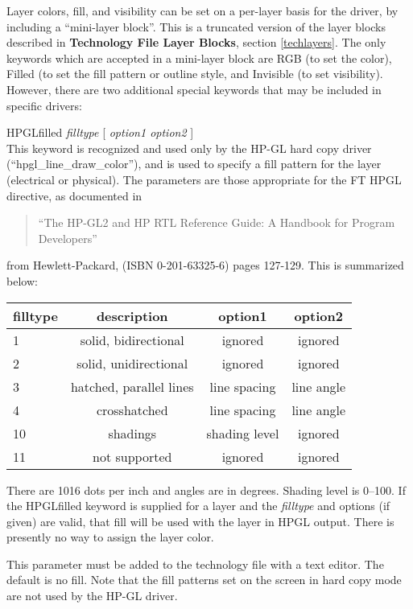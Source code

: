 Layer colors, fill, and visibility can be set on a per-layer basis for
the driver, by including a ``mini-layer block''.  This is a truncated
version of the layer blocks described in {\bf Technology File Layer
Blocks}, section \ref{techlayers}.  The only keywords which are
accepted in a mini-layer block are {\vt RGB} (to set the color), {\vt
Filled} (to set the fill pattern or outline style, and {\vt Invisible}
(to set visibility).  However, there are two additional special
keywords that may be included in specific drivers:

\begin{description}
\item{\vt HPGLfilled} {\it filltype} [ {\it option1 option2\/} ]\\
This keyword is recognized and used only by the HP-GL hard copy driver
(``hpgl\_line\_draw\_color''), and is used to specify a fill pattern
for the layer (electrical or physical).  The parameters are those
appropriate for the {\vt FT} HPGL directive, as documented in
\begin{quote}
 ``{\sc The HP-GL2 and HP RTL Reference Guide:  A
Handbook for Program Developers}''
\end{quote}
from Hewlett-Packard, (ISBN 0-201-63325-6) pages 127-129.  This is
summarized below:

\begin{tabular}{|l|c|c|c|}\hline
\bf filltype & \bf description & \bf option1 & \bf option2\\ \hline
1  & solid, bidirectional & ignored & ignored\\ \hline
2  & solid, unidirectional & ignored & ignored\\ \hline
3  & hatched, parallel lines & line spacing & line angle\\ \hline
4  & crosshatched & line spacing & line angle\\ \hline
10 & shadings & shading level & ignored\\ \hline
11 & not supported & ignored & ignored\\ \hline
\end{tabular}

There are 1016 dots per inch and angles are in degrees.  Shading level
is 0--100.  If the {\vt HPGLfilled} keyword is supplied for a layer
and the {\it filltype} and options (if given) are valid, that fill
will be used with the layer in HPGL output.  There is presently no way
to assign the layer color.

This parameter must be added to the technology file with a text
editor.  The default is no fill.  Note that the fill patterns set on
the screen in hard copy mode are not used by the HP-GL driver.


\end{description}
